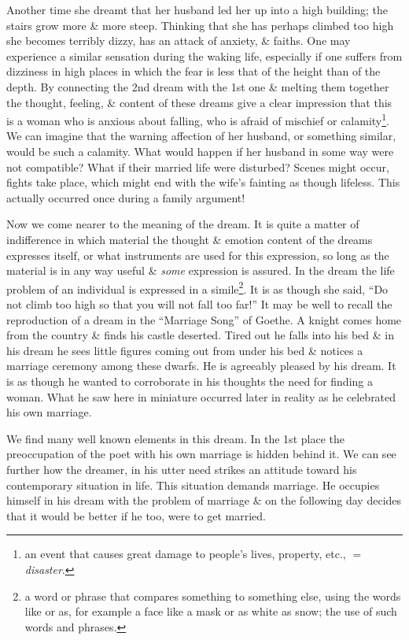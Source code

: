 \documentclass{article}
\begin{document}
Another time she dreamt that her husband led her up into a high building; the stairs grow more \& more steep. Thinking that she has perhaps climbed too high she becomes terribly dizzy, has an attack of anxiety, \& faiths. One may experience a similar sensation during the waking life, especially if one suffers from dizziness in high places in which the fear is less that of the height than of the depth. By connecting the 2nd dream with the 1st one \& melting them together the thought, feeling, \& content of these dreams give a clear impression that this is a woman who is anxious about falling, who is afraid of mischief or calamity\footnote{an event that causes great damage to people's lives, property, etc., $=$ {\it disaster}.}. We can imagine that the warning affection of her husband, or something similar, would be such a calamity. What would happen if her husband in some way were not compatible? What if their married life were disturbed? Scenes might occur, fights take place, which might end with the wife's fainting as though lifeless. This actually occurred once during a family argument!

Now we come nearer to the meaning of the dream. It is quite a matter of indifference in which material the thought \& emotion content of the dreams expresses itself, or what instruments are used for this expression, so long as the material is in any way useful \& {\it some} expression is assured. In the dream the life problem of an individual is expressed in a simile\footnote{a word or phrase that compares something to something else, using the words like or as, for example a face like a mask or as white as snow; the use of such words and phrases.}. It is as though she said, ``Do not climb too high so that you will not fall too far!'' It may be well to recall the reproduction of a dream in the ``Marriage Song'' of Goethe. A knight comes home from the country \& finds his castle deserted. Tired out he falls into his bed \& in his dream he sees little figures coming out from under his bed \& notices a marriage ceremony among these dwarfs. He is agreeably pleased by his dream. It is as though he wanted to corroborate in his thoughts the need for finding a woman. What he saw here in miniature occurred later in reality as he celebrated his own marriage.

We find many well known elements in this dream. In the 1st place the preoccupation of the poet with his own marriage is hidden behind it. We can see further how the dreamer, in his utter need strikes an attitude toward his contemporary situation in life. This situation demands marriage. He occupies himself in his dream with the problem of marriage \& on the following day decides that it would be better if he too, were to get married.
\end{document}
